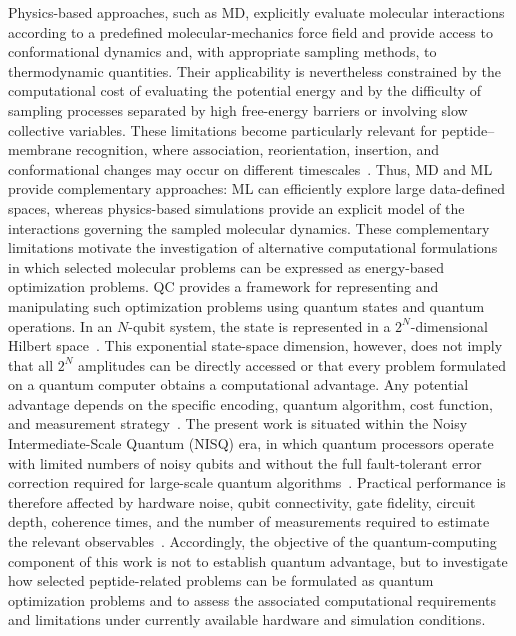 Physics-based approaches, such as MD, explicitly evaluate molecular interactions according to a predefined molecular-mechanics force field and provide access to conformational dynamics and, with appropriate sampling methods, to thermodynamic quantities. Their applicability is nevertheless constrained by the computational cost of evaluating the potential energy and by the difficulty of sampling processes separated by high free-energy barriers or involving slow collective variables. These limitations become particularly relevant for peptide--membrane recognition, where association, reorientation, insertion, and conformational changes may occur on different timescales~\cite{computational_expensive_MD}. Thus, MD and ML provide complementary approaches: ML can efficiently explore large data-defined spaces, whereas physics-based simulations provide an explicit model of the interactions governing the sampled molecular dynamics.
These complementary limitations motivate the investigation of alternative computational formulations in which selected molecular problems can be expressed as energy-based optimization problems. QC provides a framework for representing and manipulating such optimization problems using quantum states and quantum operations. In an $N$-qubit system, the state is represented in a $2^N$-dimensional Hilbert space~\cite{nielsen2010quantum,robert2021resource}. This exponential state-space dimension, however, does not imply that all $2^N$ amplitudes can be directly accessed or that every problem formulated on a quantum computer obtains a computational advantage. Any potential advantage depends on the specific encoding, quantum algorithm, cost function, and measurement strategy~\cite{nielsen2010quantum,preskill1998quantum}.
The present work is situated within the Noisy Intermediate-Scale Quantum (NISQ) era, in which quantum processors operate with limited numbers of noisy qubits and without the full fault-tolerant error correction required for large-scale quantum algorithms~\cite{preskill2018quantum}. Practical performance is therefore affected by hardware noise, qubit connectivity, gate fidelity, circuit depth, coherence times, and the number of measurements required to estimate the relevant observables~\cite{Shor1995,KITAEV20032}. Accordingly, the objective of the quantum-computing component of this work is not to establish quantum advantage, but to investigate how selected peptide-related problems can be formulated as quantum optimization problems and to assess the associated computational requirements and limitations under currently available hardware and simulation conditions.


